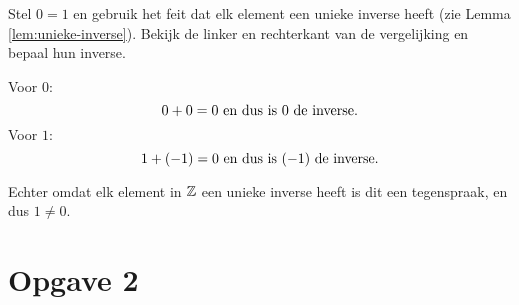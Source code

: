 \documentclass{article}
\begin{document}
\begin{enumerate}[label=\alph*)]
          Stel $0 = 1$ en gebruik het feit dat elk element
          een unieke inverse heeft (zie Lemma \ref{lem:unieke-inverse}). Bekijk de linker en rechterkant van de vergelijking en bepaal hun inverse.

          Voor $0$:
          \[0 + 0 = 0 \text{ en dus is } 0 \text{ de inverse.}\]
          Voor $1$:
          \[1 + (-1) = 0 \text{ en dus is } (-1) \text{ de inverse.}\]

          Echter omdat elk element in $\mathbb{Z}$ een unieke inverse heeft is dit een tegenspraak,
          en dus $1 \neq 0$.
\end{enumerate}

\pagebreak

\section*{Opgave 2}
\end{document}
